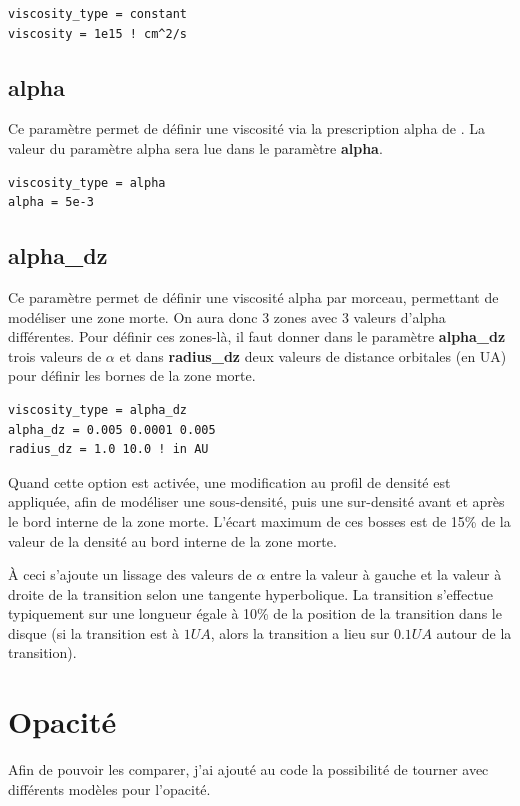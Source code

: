 \begin{verbatim}
viscosity_type = constant
viscosity = 1e15 ! cm^2/s
\end{verbatim}

\subsection{alpha}
Ce paramètre permet de définir une viscosité via la prescription alpha de \cite{shakura1973black}. La valeur du paramètre alpha sera lue dans le paramètre \textbf{alpha}. 

\begin{verbatim}
viscosity_type = alpha
alpha = 5e-3
\end{verbatim}

\subsection{alpha\_dz}\label{sec:dead_zone}
Ce paramètre permet de définir une viscosité alpha par morceau, permettant de modéliser une zone morte. On aura donc 3 zones avec 3 valeurs d'alpha différentes. Pour définir ces zones-là, il faut donner dans le paramètre \textbf{alpha\_dz} trois valeurs de $\alpha$ et dans \textbf{radius\_dz} deux valeurs de distance orbitales (en \unit{UA}) pour définir les bornes de la zone morte.
\begin{verbatim}
viscosity_type = alpha_dz
alpha_dz = 0.005 0.0001 0.005
radius_dz = 1.0 10.0 ! in AU
\end{verbatim}

Quand cette option est activée, une modification au profil de densité est appliquée, afin de modéliser une sous-densité, puis une sur-densité avant et après le bord interne de la zone morte. L'écart maximum de ces bosses est de 15\% de la valeur de la densité au bord interne de la zone morte. 

À ceci s'ajoute un lissage des valeurs de $\alpha$ entre la valeur à gauche et la valeur à droite de la transition selon une tangente hyperbolique. La transition s'effectue typiquement sur une longueur égale à 10\% de la position de la transition dans le disque (si la transition est à $1\unit{UA}$, alors la transition a lieu sur $0.1\unit{UA}$ autour de la transition).

\section{Opacité}
Afin de pouvoir les comparer, j'ai ajouté au code la possibilité de tourner avec différents modèles pour l'opacité. 

